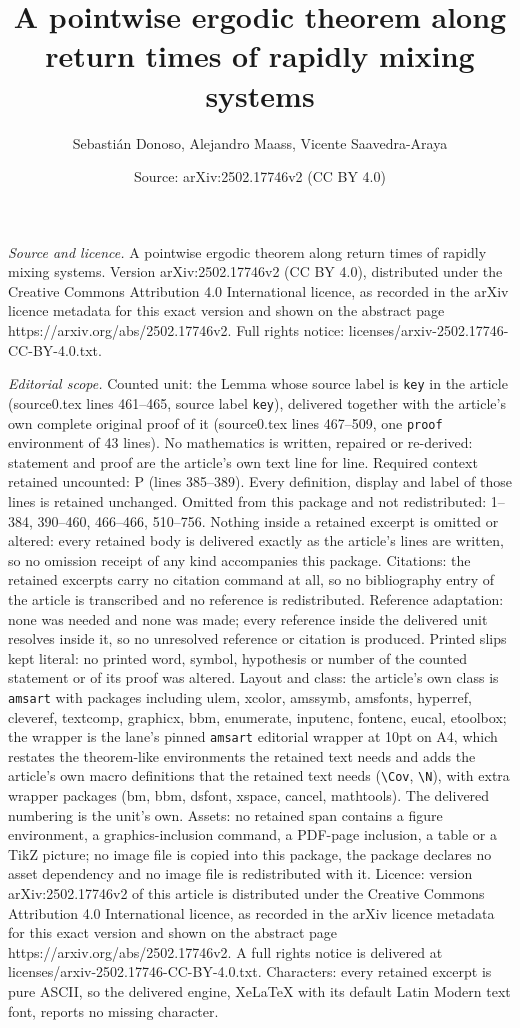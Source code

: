 \documentclass[10pt,a4paper]{amsart}
\title[A pointwise ergodic theorem along return times of rapidly mi]{A pointwise ergodic theorem along return times of rapidly mixing systems}
\author{Sebasti\'an Donoso, Alejandro Maass, Vicente Saavedra-Araya}
\date{Source: arXiv:2502.17746v2 (CC BY 4.0)}
\begin{document}
\maketitle

\noindent\emph{Source and licence.} A pointwise ergodic theorem along return times of rapidly mixing systems. Version arXiv:2502.17746v2 (CC BY 4.0), distributed under the Creative Commons Attribution 4.0 International licence, as recorded in the arXiv licence metadata for this exact version and shown on the abstract page https://arxiv.org/abs/2502.17746v2. Full rights notice: licenses/arxiv-2502.17746-CC-BY-4.0.txt.\par\smallskip

\noindent\textit{Editorial scope.} Counted unit: the Lemma whose source label is \texttt{key} in the article (source0.tex lines 461--465, source label \texttt{key}), delivered together with the article's own complete original proof of it (source0.tex lines 467--509, one \texttt{proof} environment of 43 lines). No mathematics is written, repaired or re-derived: statement and proof are the article's own text line for line. Required context retained uncounted: P (lines 385--389). Every definition, display and label of those lines is retained unchanged. Omitted from this package and not redistributed: 1--384, 390--460, 466--466, 510--756. Nothing inside a retained excerpt is omitted or altered: every retained body is delivered exactly as the article's lines are written, so no omission receipt of any kind accompanies this package. Citations: the retained excerpts carry no citation command at all, so no bibliography entry of the article is transcribed and no reference is redistributed. Reference adaptation: none was needed and none was made; every reference inside the delivered unit resolves inside it, so no unresolved reference or citation is produced. Printed slips kept literal: no printed word, symbol, hypothesis or number of the counted statement or of its proof was altered. Layout and class: the article's own class is \texttt{amsart} with packages including ulem, xcolor, amssymb, amsfonts, hyperref, cleveref, textcomp, graphicx, bbm, enumerate, inputenc, fontenc, eucal, etoolbox; the wrapper is the lane's pinned \texttt{amsart} editorial wrapper at 10pt on A4, which restates the theorem-like environments the retained text needs and adds the article's own macro definitions that the retained text needs (\texttt{\textbackslash Cov}, \texttt{\textbackslash N}), with extra wrapper packages (bm, bbm, dsfont, xspace, cancel, mathtools). The delivered numbering is the unit's own. Assets: no retained span contains a figure environment, a graphics-inclusion command, a PDF-page inclusion, a table or a TikZ picture; no image file is copied into this package, the package declares no asset dependency and no image file is redistributed with it. Licence: version arXiv:2502.17746v2 of this article is distributed under the Creative Commons Attribution 4.0 International licence, as recorded in the arXiv licence metadata for this exact version and shown on the abstract page https://arxiv.org/abs/2502.17746v2. A full rights notice is delivered at licenses/arxiv-2502.17746-CC-BY-4.0.txt. Characters: every retained excerpt is pure ASCII, so the delivered engine, XeLaTeX with its default Latin Modern text font, reports no missing character.
\end{document}
